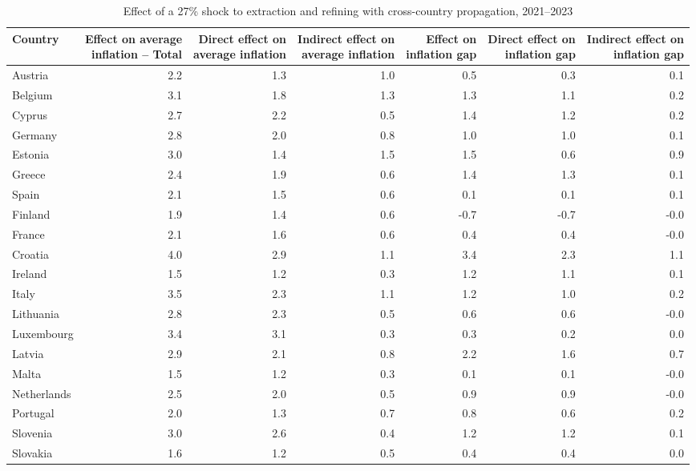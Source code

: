 \begin{table}[H]
\centering
\caption{Effect of a 27\% shock to extraction and refining with cross-country propagation, 2021--2023}
\label{tab:shock-oil-gas-chain-ea20}
\scriptsize
\setlength{\tabcolsep}{1.2pt}
\begin{tabular}{lrrrrrr}
\toprule
Country & \shortstack{Effect on average\\inflation -- Total} & \shortstack{Direct effect on\\average inflation} & \shortstack{Indirect effect on\\average inflation} & \shortstack{Effect on\\inflation gap} & \shortstack{Direct effect on\\inflation gap} & \shortstack{Indirect effect on\\inflation gap}
 \\
\midrule
Austria & 2.2 & 1.3 & 1.0 & 0.5 & 0.3 & 0.1
 \\
Belgium & 3.1 & 1.8 & 1.3 & 1.3 & 1.1 & 0.2
 \\
Cyprus & 2.7 & 2.2 & 0.5 & 1.4 & 1.2 & 0.2
 \\
Germany & 2.8 & 2.0 & 0.8 & 1.0 & 1.0 & 0.1
 \\
Estonia & 3.0 & 1.4 & 1.5 & 1.5 & 0.6 & 0.9
 \\
Greece & 2.4 & 1.9 & 0.6 & 1.4 & 1.3 & 0.1
 \\
Spain & 2.1 & 1.5 & 0.6 & 0.1 & 0.1 & 0.1
 \\
Finland & 1.9 & 1.4 & 0.6 & -0.7 & -0.7 & -0.0
 \\
France & 2.1 & 1.6 & 0.6 & 0.4 & 0.4 & -0.0
 \\
Croatia & 4.0 & 2.9 & 1.1 & 3.4 & 2.3 & 1.1
 \\
Ireland & 1.5 & 1.2 & 0.3 & 1.2 & 1.1 & 0.1
 \\
Italy & 3.5 & 2.3 & 1.1 & 1.2 & 1.0 & 0.2
 \\
Lithuania & 2.8 & 2.3 & 0.5 & 0.6 & 0.6 & -0.0
 \\
Luxembourg & 3.4 & 3.1 & 0.3 & 0.3 & 0.2 & 0.0
 \\
Latvia & 2.9 & 2.1 & 0.8 & 2.2 & 1.6 & 0.7
 \\
Malta & 1.5 & 1.2 & 0.3 & 0.1 & 0.1 & -0.0
 \\
Netherlands & 2.5 & 2.0 & 0.5 & 0.9 & 0.9 & -0.0
 \\
Portugal & 2.0 & 1.3 & 0.7 & 0.8 & 0.6 & 0.2
 \\
Slovenia & 3.0 & 2.6 & 0.4 & 1.2 & 1.2 & 0.1
 \\
Slovakia & 1.6 & 1.2 & 0.5 & 0.4 & 0.4 & 0.0

\end{tabular}
\end{table}
